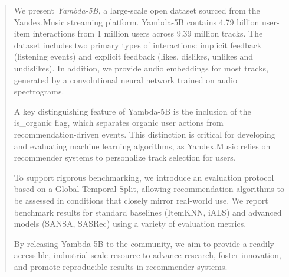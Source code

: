 \documentclass[sigconf,authorversion,nonacm]{acmart}
\begin{document}
\begin{abstract}
We present \textit{Yambda-5B}, a large-scale open dataset sourced from the Yandex.Music streaming platform. Yambda-5B contains 4.79 billion user-item interactions from 1 million users across 9.39 million tracks. The dataset includes two primary types of interactions: implicit feedback (listening events) and explicit feedback (likes, dislikes, unlikes and undislikes). In addition, we provide audio embeddings for most tracks, generated by a convolutional neural network trained on audio spectrograms.

A key distinguishing feature of Yambda-5B is the inclusion of the is\_organic flag, which separates organic user actions from recommendation-driven events. This distinction is critical for developing and evaluating machine learning algorithms, as Yandex.Music relies on recommender systems to personalize track selection for users.

To support rigorous benchmarking, we introduce an evaluation protocol based on a Global Temporal Split, allowing recommendation algorithms to be assessed in conditions that closely mirror real-world use. We report benchmark results for standard baselines (ItemKNN, iALS) and advanced models (SANSA, SASRec) using a variety of evaluation metrics.

By releasing Yambda-5B to the community, we aim to provide a readily accessible, industrial-scale resource to advance research, foster innovation, and promote reproducible results in recommender systems.
\end{abstract}


\maketitle
\end{document}
